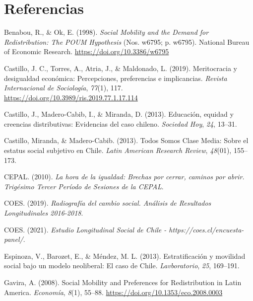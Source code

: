 \documentclass[
]{article}
\begin{document}
\newpage

\hypertarget{referencias}{%
\section{Referencias}\label{referencias}}

\hypertarget{refs}{}
\leavevmode\hypertarget{ref-benabou_Social_1998}{}%
Benabou, R., \& Ok, E. (1998). \emph{Social Mobility and the Demand for
Redistribution: The POUM Hypothesis} (Nos. w6795; p. w6795). National
Bureau of Economic Research. \url{https://doi.org/10.3386/w6795}

\leavevmode\hypertarget{ref-castillo_Meritocracia_2019}{}%
Castillo, J. C., Torres, A., Atria, J., \& Maldonado, L. (2019).
Meritocracia y desigualdad económica: Percepciones, preferencias e
implicancias. \emph{Revista Internacional de Sociología}, \emph{77}(1),
117. \url{https://doi.org/10.3989/ris.2019.77.1.17.114}

\leavevmode\hypertarget{ref-castillo_Educacion_2013}{}%
Castillo, J., Madero-Cabib, I., \& Miranda, D. (2013). Educación,
equidad y creencias distributivas: Evidencias del caso chileno.
\emph{Sociedad Hoy}, \emph{24}, 13--31.

\leavevmode\hypertarget{ref-castillo_Todos_2013}{}%
Castillo, Miranda, \& Madero-Cabib. (2013). Todos Somos Clase Media:
Sobre el estatus social subjetivo en Chile. \emph{Latin American
Research Review}, \emph{48}(01), 155--173.

\leavevmode\hypertarget{ref-cepal_hora_2010}{}%
CEPAL. (2010). \emph{La hora de la igualdad: Brechas por cerrar, caminos
por abrir. Trigésimo Tercer Período de Sesiones de la CEPAL}.

\leavevmode\hypertarget{ref-coes_Radiografia_2019}{}%
COES. (2019). \emph{Radiografía del cambio social. Análisis de
Resultados Longitudinales 2016-2018}.

\leavevmode\hypertarget{ref-coes_Estudio_2021}{}%
COES. (2021). \emph{Estudio Longitudinal Social de Chile -
https://coes.cl/encuesta-panel/}.

\leavevmode\hypertarget{ref-espinoza_Estratificacion_2013}{}%
Espinoza, V., Barozet, E., \& Méndez, M. L. (2013). Estratificación y
movilidad social bajo un modelo neoliberal: El caso de Chile.
\emph{Lavboratorio}, \emph{25}, 169--191.

\leavevmode\hypertarget{ref-gavira_Social_2008}{}%
Gavira, A. (2008). Social Mobility and Preferences for Redistribution in
Latin America. \emph{Economía}, \emph{8}(1), 55--88.
\url{https://doi.org/10.1353/eco.2008.0003}
\end{document}
